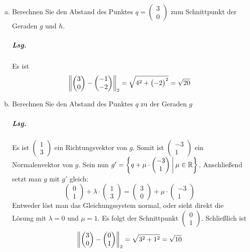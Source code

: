 \documentclass{scrreprt}
\begin{document}
\begin{enumerate}[(a)]
\item Berechnen Sie den Abstand des Punktes
  $q = \begin{pmatrix}3\\0\end{pmatrix}$ zum Schnittpunkt der Geraden $g$ und
  $h$.

  \subparagraph{Lsg.} Es ist
  \[
    \norm{\begin{pmatrix}3\\0\end{pmatrix} - \begin{pmatrix}-1\\-2\end{pmatrix}}_2
    = \sqrt{4^2 + \qty\big(-2)^2} = \sqrt{20}
  \]

\newpage
\item Berechnen Sie den Abstand des Punktes $q$ zu der Geraden $g$

  \subparagraph{Lsg.} Es ist $\begin{pmatrix}1\\3\end{pmatrix}$ ein
  Richtungsvektor von $g$.
  Somit ist $\begin{pmatrix}-3\\1\end{pmatrix}$ ein Normalenvektor von $g$.
  Sein nun $g' = \qty{q + \mu \cdot \begin{pmatrix}-3\\1\end{pmatrix} \:\middle|\: \mu \in \mathbb{R}}$.
  Anschließend setzt man $g$ mit $g'$ gleich:
  \[
    \begin{pmatrix}0\\1\end{pmatrix} + \lambda \cdot
    \begin{pmatrix}1\\3\end{pmatrix}
    =
    \begin{pmatrix}3\\0\end{pmatrix} + \mu \cdot
    \begin{pmatrix}-3\\1\end{pmatrix}
  \]
  Entweder löst man das Gleichungssystem normal, oder sieht direkt die Lösung
  mit $\lambda = 0$ und $\mu = 1$.
  Es folgt der Schnittpunkt $\begin{pmatrix}0\\1\end{pmatrix}$.
  Schließlich ist
  \[
    \norm{\begin{pmatrix}3\\0\end{pmatrix} - \begin{pmatrix}0\\1\end{pmatrix}}_2
    = \sqrt{3^2 + 1^2} = \sqrt{10}
  \]
  
\end{enumerate}
\end{document}
